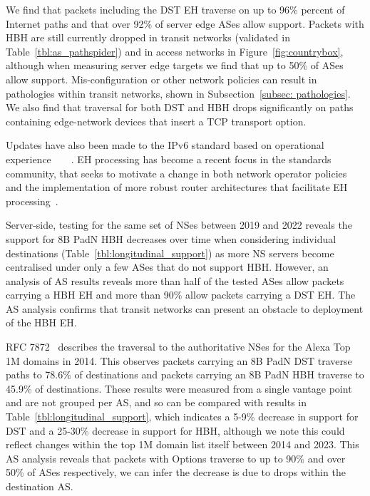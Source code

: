 \documentclass[conference]{IEEEtran}
\begin{document}
We find that packets including the DST EH traverse on up to 96\% percent of Internet paths and that over 92\% of server edge ASes allow support.
Packets with HBH are still currently dropped in transit networks (validated in Table~\ref{tbl:as_pathspider}) and in access networks in Figure~\ref{fig:countrybox}, although when measuring server edge targets we find that up to 50\% of ASes allow support. Mis-configuration or other network policies can result in pathologies within transit networks, shown in Subsection~\ref{subsec: pathologies}. We also find that traversal for both DST and HBH drops significantly on paths containing edge-network devices that insert a TCP transport option.


Updates have also been made to the IPv6 standard based on
operational experience~\cite{RFC5722}~\cite{RFC6946}~\cite{RFC6564}~\cite{RFC8200}. EH processing has become a recent focus in the standards community, that seeks to motivate a change in both network operator policies and the implementation of more robust router architectures that facilitate EH processing~\cite{ietf-6man-HBH-processing-06, ietf-v6ops-HBH-03, ietf-6man-eh-limits-02}. 




Server-side, testing for the same set of NSes between 2019 and 2022 reveals the support for 8B PadN HBH decreases over time when considering individual destinations (Table~\ref{tbl:longitudinal_support}) as more NS servers become centralised under only a few ASes that do not support HBH.  However, an analysis of AS results reveals more than half of the tested ASes allow packets carrying a HBH EH and more than 90\% allow packets carrying a DST EH. The AS analysis confirms that transit networks can present an obstacle to deployment of the HBH EH.
 
RFC 7872~\cite{RFC7872} describes the traversal to the authoritative NSes for the Alexa Top 1M domains in 2014. This observes packets carrying an 8B PadN DST traverse paths to  78.6\% of destinations and packets carrying an 8B PadN HBH traverse to 45.9\% of destinations. These results were measured from a single vantage point and are not grouped per AS, and so can be compared with results in Table~\ref{tbl:longitudinal_support}, which indicates a 5-9\% decrease in support for DST and a 25-30\% decrease in support for HBH, although we note this could reflect changes within the top 1M domain list itself between 2014 and 2023.
This AS analysis reveals that packets with Options traverse to up to 90\% and over 50\% of ASes respectively, we can infer the decrease is due to drops within the destination AS.
\end{document}
